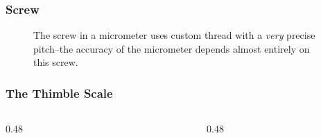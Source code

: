 \begin{frame}
	\frametitle{Screw}

    \begin{figure}
        \centering
        

        \vspace{0.5em}
        {\footnotesize The screw in a micrometer uses custom thread with a \emph{very} precise pitch--the accuracy of the micrometer depends almost entirely on this screw.\par}
    \end{figure}
\end{frame}

\begin{frame}
	\frametitle{The Thimble Scale}

    \begin{columns}
        \begin{column}{0.48\linewidth}            
            \begin{figure}
                \centering
                \resizebox{\linewidth}{!}{
                    
                    }
            \end{figure} 
        \end{column}
        \begin{column}{0.48\linewidth}
        \end{column}
    \end{columns}
\end{frame}


